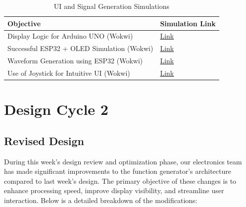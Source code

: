 \documentclass[12pt,a4paper]{article}
\begin{document}
\begin{table}[h]
    \centering
    \begin{tabular}{|l|l|}
        \hline
        \textbf{Objective} & \textbf{Simulation Link} \\
        \hline
        Display Logic for Arduino UNO (Wokwi) & \href{https://wokwi.com/projects/421519284834524161}{Link} \\
        Successful ESP32 + OLED Simulation (Wokwi) & \href{https://wokwi.com/projects/421332527375177729}{Link} \\
        Waveform Generation using ESP32 (Wokwi) & \href{https://wokwi.com/projects/421332355931919361}{Link} \\
        Use of Joystick for Intuitive UI (Wokwi) & \href{https://wokwi.com/projects/421223590526773249}{Link} \\
        \hline
    \end{tabular}
    \caption{UI and Signal Generation Simulations}
\end{table}
\clearpage
\section{Design Cycle 2}
\subsection{Revised Design}
During this week's design review and optimization phase, our electronics team has made significant improvements to the function generator's architecture compared to last week's design. The primary objective of these changes is to enhance processing speed, improve display visibility, and streamline user interaction. Below is a detailed breakdown of the modifications:
\end{document}
